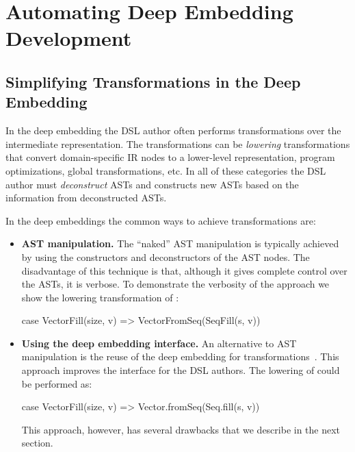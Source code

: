 \part{Automating Deep Embedding Development}
\label{part:deep-embedding-development-with-a-breeze}



\chapter{Simplifying Transformations in the Deep Embedding}
\label{sec:yy-for-transformations}


In the deep embedding the DSL author often performs transformations over the intermediate representation. The
transformations can be \emph{lowering} transformations that convert
domain-specific IR nodes to a lower-level representation, program optimizations, global
transformations, etc. In all of these categories the DSL author must \emph{deconstruct} ASTs
 and constructs new ASTs based on the information from deconstructed ASTs.

In the deep embeddings the common ways to achieve transformations are:\begin{itemize}

\item {\bf AST manipulation.} The ``naked'' AST manipulation is typically achieved by
 using the constructors and deconstructors of the AST nodes. The disadvantage of this
 technique is that, although it gives complete control over the ASTs, it is verbose. To demonstrate
 the verbosity of the approach we show the lowering transformation of :\begin{lstparagraph}
 case VectorFill(size, v) =>
   VectorFromSeq(SeqFill(s, v))
 \end{lstparagraph}

\item {\bf Using the deep embedding interface.} An alternative to AST manipulation is
 the reuse of the deep embedding for transformations~\cite{rompf_optimizing_2013}. This
 approach improves the interface for the DSL authors. The lowering of 
 could be performed as:\begin{lstparagraph}
 case VectorFill(size, v) =>
   Vector.fromSeq(Seq.fill(s, v))
 \end{lstparagraph}
 This approach, however, has several drawbacks that we describe in the next section.
\end{itemize}

